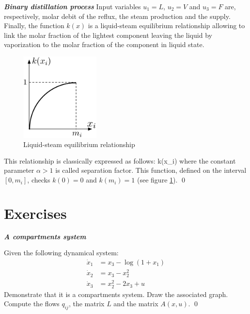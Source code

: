\begin{exemple}{\bf \em Binary distillation process}
Input variables $u_1 = L$, $u_2 = V$ and $u_3 = F$ are, respectively, molar debit of the reflux, the steam production and the supply.
Finally, the function $k(x)$ is a liquid-steam equilibrium relationship allowing to link the molar fraction of the lightest component
leaving the liquid by vaporization to the molar fraction of the component in liquid state. 
\begin{figure}[ht]
\begin{center}
\includegraphics[width=4cm]{separ}
\caption{Liquid-steam equilibrium relationship}
\label{Fig:separ}
\end{center} 
\end{figure}

\noindent This relationship is classically expressed as follows:
\eqnn
k(x_i) \triangleq {}
\eeqnn
where the constant parameter $\alpha > 1$ is called separation factor.
This function, defined on the interval $[0,m_i]$, checks $k(0) = 0$ and
$k(m_i) = 1$ (see figure \ref{Fig:separ}). \qed  
\end{exemple}

\section{Exercises}

\begin{exercice}{\bf \em A compartments system}

Given the following dynamical system:
\begin{align*}
\dot x_{1} &= x_{3} - \log (1+x_{1}) \\
\dot x_{2} &= x_{3} - x_{2}^2 \\
\dot x_{3} &= x_{2}^2 - 2x_{3} + u
\end{align*}
Demonstrate that it is a compartments system. Draw the associated graph. Compute the flows $q_{ij}$, the matrix $L$ and the matrix $A(x,u)$. \qed
\end{exercice}
\vv

